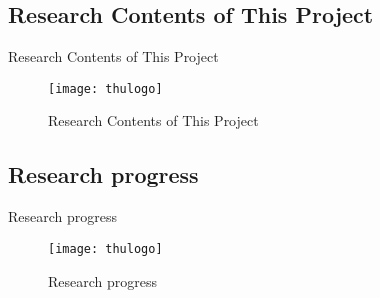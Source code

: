 \subsection{Research Contents of This Project}

\begin{frame}{Research Contents of This Project}
  \begin{figure}
    \texttt{[image: thulogo]}
    \caption{Research Contents of This Project}
  \end{figure}
\end{frame}

\subsection{Research progress}

\begin{frame}{Research progress}
  \begin{figure}
    \texttt{[image: thulogo]}
    \caption{Research progress}
  \end{figure}
\end{frame}